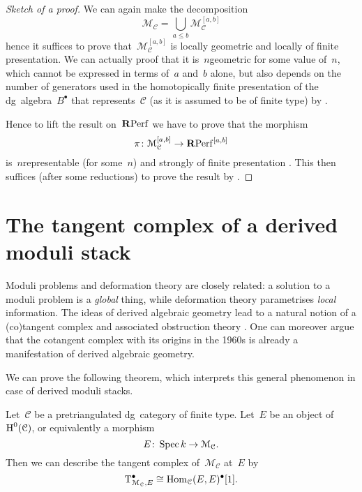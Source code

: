 \begin{refsection}
\begin{theorem}
  \begin{proof}[Sketch of a proof]
    We can again make the decomposition
    \begin{equation}
      \mathcal{M}_{\mathcal{C}}=\bigcup_{a\leq b}\mathcal{M}_{\mathcal{C}}^{[a,b]}
    \end{equation}
    hence it suffices to prove that~$\mathcal{M}_{\mathcal{C}}^{[a,b]}$ is locally geometric and locally of finite presentation. We can actually proof that it is~$n$\dash geometric for some value of~$n$, which cannot be expressed in terms of~$a$ and~$b$ alone, but also depends on the number of generators used in the homotopically finite presentation of the dg~algebra~$B^\bullet$ that represents~$\mathcal{C}$ (as it is assumed to be of finite type) by \cite[corollary 2.12]{toen-vaquie}.

    Hence to lift the result on~$\mathbf{R}\mathrm{Perf}$ we have to prove that the morphism
    \begin{equation}
      \pi\colon\mathcal{M}_{\mathcal{C}}^{[a,b]}\to\mathbf{R}\mathrm{Perf}^{[a,b]}
    \end{equation}
    is~$n$\dash representable (for some~$n$) and strongly of finite presentation \cite[lemma 2.20]{toen-vaquie}. This then suffices (after some reductions) to prove the result by \cite[lemma 2.15]{toen-vaquie}.
  \end{proof}
\end{theorem}


\section{The tangent complex of a derived moduli stack}
Moduli problems and deformation theory are closely related: a solution to a moduli problem is a \emph{global} thing, while deformation theory parametrises \emph{local} information. The ideas of derived algebraic geometry lead to a natural notion of a (co)tangent complex and associated obstruction theory \cite[section 2.2]{hagII}. One can moreover argue that the cotangent complex with its origins in the 1960s is already a manifestation of derived algebraic geometry.

We can prove the following theorem, which interprets this general phenomenon \cite[section 1.4]{hagII} in case of derived moduli stacks.
\begin{theorem}
  Let~$\mathcal{C}$ be a pretriangulated dg~category of finite type. Let~$E$ be an object of~$\operatorname{H}^0(\mathcal{C})$, or equivalently a morphism
  \begin{equation}
    E\colon\operatorname{Spec} k\to\mathcal{M}_{\mathcal{C}}.
  \end{equation}
  Then we can describe the tangent complex of~$\mathcal{M}_{\mathcal{C}}$ at~$E$ by
  \begin{equation}
    \mathrm{T}_{\mathcal{M}_{\mathcal{C}},E}^\bullet\cong\mathrm{Hom}_{\mathcal{C}}(E,E)^\bullet[1].
  \end{equation}
\end{theorem}


\end{refsection}
